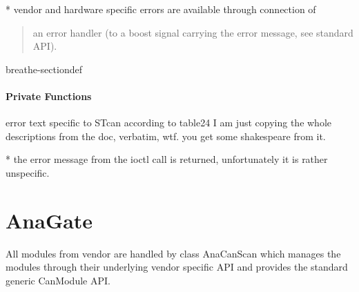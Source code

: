 \documentclass[a4paper,10pt,english]{sphinxmanual}
\begin{document}
\sphinxAtStartPar
{}
* vendor and hardware specific errors are available through connection of
\begin{quote}

\sphinxAtStartPar
an error handler (to a boost signal carrying the error message, see standard API).
\end{quote}

\begin{fulllineitems}
%
\pysigstartmultiline
{}%
\pysigstopmultiline
\begin{sphinxuseclass}{breathe-sectiondef}\subsubsection*{Private Functions}

\begin{fulllineitems}
\label{\detokenize{vendors/systec:_CPPv4N9STCanScan17STcanGetErrorTextEl}}%
\pysigstartmultiline
{}%
\pysigstopmultiline
\sphinxAtStartPar
error text specific to STcan according to table24 I am just copying the whole descriptions from the doc, verbatim, wtf. you get some shakespeare from it. 

\end{fulllineitems}


\end{sphinxuseclass}
\end{fulllineitems}


\sphinxAtStartPar
{}
* the error message from the ioctl call is returned, unfortunately it is rather unspecific.


\chapter{AnaGate}
\label{\detokenize{vendors/anagate:anagate}}\label{\detokenize{vendors/anagate::doc}}
\sphinxAtStartPar
All modules from vendor {\hyperref[\detokenize{vendors/anagate:anagate}]{}} are handled by class AnaCanScan which manages the modules through their underlying vendor specific API and provides
the standard generic CanModule API.
\end{document}
